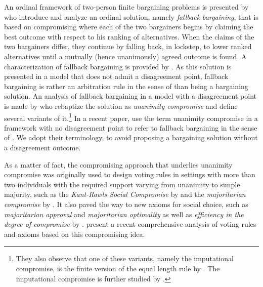 \documentclass[version=3.21, pagesize, twoside=off, bibliography=totoc, DIV=calc, fontsize=12pt, a4paper]{scrartcl}
\begin{document}
An ordinal framework of two-person finite bargaining problems is presented by \citet{BramsKilgour2001} who introduce and analyze an ordinal solution, namely \textit{fallback bargaining}, that is based on compromising where each of the two bargainers begins by claiming the best outcome with respect to his ranking of alternatives. When the claims of the two bargainers differ, they continue by falling back, in lockstep, to lower ranked alternatives until a mutually (hence unanimously) agreed outcome is found. A characterization of fallback bargaining is provided by \citet{de2012reason}. As this solution is presented in a model that does not admit a disagreement point, fallback bargaining is rather an arbitration rule in the sense of \citet{Sprumont1993} than being a bargaining solution. An analysis of fallback bargaining in a model with a disagreement point is made by \citet{KibrisSertel2007} who rebaptize the solution as \textit{unanimity compromise} and define several variants of it.\footnote{They also observe that one of these variants, namely the imputational compromise, is the finite version of the equal length rule by \citet{thomson2019equal}. The imputational compromise is further studied by \citet{ConleyWilkie2012}.} In a recent paper, \citet{barbera2022compromising} use the term unanimity compromise in a framework with no disagreement point to refer to fallback bargaining in the sense of \citet{BramsKilgour2001}. We adopt their terminology, to avoid proposing a bargaining solution without a disagreement outcome.


 
As a matter of fact, the compromising approach that underlies unanimity compromise was originally used to design voting rules in settings with more than two individuals with the required support varying from unanimity to simple majority, such as the \textit{Kant-Rawls Social Compromise} by \citet{HurwiczSertel1997} and the \textit{majoritarian compromise} by \citet{sertel1999majoritarian}. It also paved the way to new axioms for social choice, such as \textit{majoritarian approval} and \textit{majoritarian optimality} as well as \textit{efficiency in the degree of compromise} by \citet{ozkal2004efficiency}.
\citet{merlin2019compromise} present a recent comprehensive analysis of voting rules and axioms based on this compromising idea.
\end{document}
